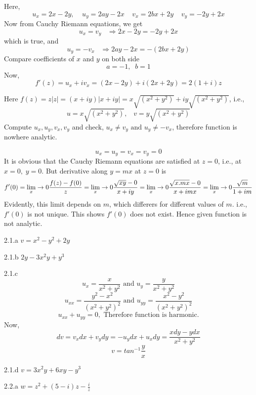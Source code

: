 \begin{Solution}{2.11}
Here,
\[u_x=2x-2y,\;\;\;\;u_y=2ay-2x\;\;\;\;v_x=2bx+2y\;\;\;\;v_y=-2y+2x\]
Now from Cauchy Riemann equations, we get
\[u_x=v_y\;\;\;\Rightarrow 2x-2y=-2y+2x\]
which is true, and
\[u_y=-v_x\;\;\;\Rightarrow 2ay-2x=-(2bx+2y)\]
Compare coefficients of $x$ and $y$ on both side
\[a=-1,\;\;b=1\]
Now,
\[f'(z)=u_x+iv_x = (2x-2y)+i(2x+2y) = 2(1+i)z\]
\end{Solution}
\begin{Solution}{2.12}
Here $f(z)=z|z| = (x+iy)|x+iy| = x\sqrt{(x^2+y^2)}+iy\sqrt{(x^2+y^2)}$, i.e.,
\[u=x\sqrt{(x^2+y^2)},\;\;\;v=y\sqrt{(x^2+y^2)}\]
Compute $u_x,u_y,v_x,v_y$ and check, $u_x\neq v_y \text{ and } u_y \neq -v_x$, therefore function is nowhere analytic.
\end{Solution}
\begin{Solution}{2.15}
\[u_x=u_y=v_x=v_y =0\]
It is obvious that the Cauchy Riemann equations are satisfied at $z=0$, i.e., at $x=0,\;y=0$.
But derivative along $y=mx$ at $z=0$ is
\[f'(0)=\lim_x\rightarrow 0 \frac{f(z)-f(0)}{z}=\lim_x\rightarrow 0 \frac{\sqrt{xy}-0}{x+iy} = \lim_x\rightarrow 0 \frac{\sqrt{x.mx}-0}{x+imx} = \lim_x\rightarrow 0 \frac{\sqrt{m}}{1+im} \]
Evidently, this limit depends on $m$, which differers for different values of $m$. i.e., $f'(0)$ is not unique. This shows $f'(0)$ does not exist. Hence given function is not analytic.
\end{Solution}
\begin{Solution}{2.1.a}
        $v=x^2-y^2+2y$
        
\end{Solution}
\begin{Solution}{2.1.b}
        $2y-3x^2y+y^3$
        
\end{Solution}
\begin{Solution}{2.1.c}
        \[u_x=\frac{x}{x^2+y^2} \text{ and }u_y=\frac{y}{x^2+y^2} \]
        \[u_{xx}=\frac{y^2-x^2}{(x^2+y^2)^2} \text{ and }u_{yy}=\frac{x^2-y^2}{(x^2+y^2)^2} \]
        \[u_{xx}+u_{yy} = 0 , \text{ Therefore function is harmonic.}\]
        Now,
        \[dv=v_xdx + v_ydy = -u_ydx + u_xdy = \frac{xdy-ydx}{x^2+y^2} \]
        \[v=tan^{-1} \frac{y}{x}\]
        
\end{Solution}
\begin{Solution}{2.1.d}
        $v=3x^2y + 6xy - y^3$
        
\end{Solution}
\begin{Solution}{2.2.a}
        $w=z^{2}+(5-i)z-\frac{i}{z}$
        
\end{Solution}
